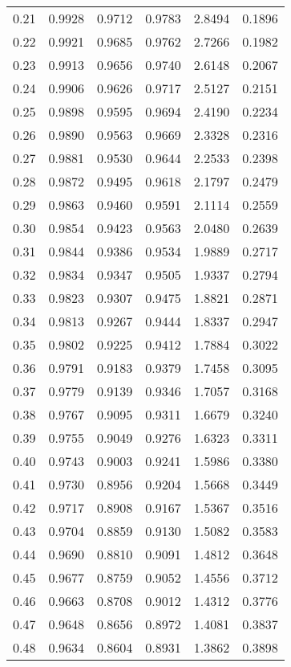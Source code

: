 \documentclass{article}
\begin{document}
\begin{longtable}{cccccc}
0.21 & 0.9928 & 0.9712 & 0.9783 & 2.8494 & 0.1896 \\
0.22 & 0.9921 & 0.9685 & 0.9762 & 2.7266 & 0.1982 \\
0.23 & 0.9913 & 0.9656 & 0.9740 & 2.6148 & 0.2067 \\
0.24 & 0.9906 & 0.9626 & 0.9717 & 2.5127 & 0.2151 \\
0.25 & 0.9898 & 0.9595 & 0.9694 & 2.4190 & 0.2234 \\
0.26 & 0.9890 & 0.9563 & 0.9669 & 2.3328 & 0.2316 \\
0.27 & 0.9881 & 0.9530 & 0.9644 & 2.2533 & 0.2398 \\
0.28 & 0.9872 & 0.9495 & 0.9618 & 2.1797 & 0.2479 \\
0.29 & 0.9863 & 0.9460 & 0.9591 & 2.1114 & 0.2559 \\
0.30 & 0.9854 & 0.9423 & 0.9563 & 2.0480 & 0.2639 \\
0.31 & 0.9844 & 0.9386 & 0.9534 & 1.9889 & 0.2717 \\
0.32 & 0.9834 & 0.9347 & 0.9505 & 1.9337 & 0.2794 \\
0.33 & 0.9823 & 0.9307 & 0.9475 & 1.8821 & 0.2871 \\
0.34 & 0.9813 & 0.9267 & 0.9444 & 1.8337 & 0.2947 \\
0.35 & 0.9802 & 0.9225 & 0.9412 & 1.7884 & 0.3022 \\
0.36 & 0.9791 & 0.9183 & 0.9379 & 1.7458 & 0.3095 \\
0.37 & 0.9779 & 0.9139 & 0.9346 & 1.7057 & 0.3168 \\
0.38 & 0.9767 & 0.9095 & 0.9311 & 1.6679 & 0.3240 \\
0.39 & 0.9755 & 0.9049 & 0.9276 & 1.6323 & 0.3311 \\
0.40 & 0.9743 & 0.9003 & 0.9241 & 1.5986 & 0.3380 \\
0.41 & 0.9730 & 0.8956 & 0.9204 & 1.5668 & 0.3449 \\
0.42 & 0.9717 & 0.8908 & 0.9167 & 1.5367 & 0.3516 \\
0.43 & 0.9704 & 0.8859 & 0.9130 & 1.5082 & 0.3583 \\
0.44 & 0.9690 & 0.8810 & 0.9091 & 1.4812 & 0.3648 \\
0.45 & 0.9677 & 0.8759 & 0.9052 & 1.4556 & 0.3712 \\
0.46 & 0.9663 & 0.8708 & 0.9012 & 1.4312 & 0.3776 \\
0.47 & 0.9648 & 0.8656 & 0.8972 & 1.4081 & 0.3837 \\
0.48 & 0.9634 & 0.8604 & 0.8931 & 1.3862 & 0.3898 \\

\end{longtable}
\end{document}
